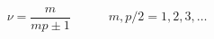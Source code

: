 \begin{equation}
\nu =\frac{m}{mp\pm 1}\qquad \quad m,p/2=1,2,3,\ldots  \label{Jain}
\end{equation}

